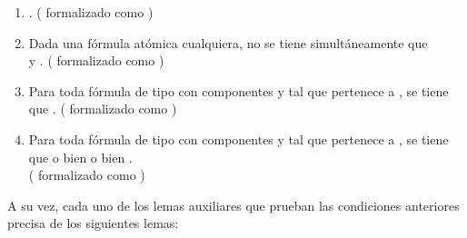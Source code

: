 \begin{isabellebody}
\begin{isamarkuptext}
    \begin{enumerate}
     \item {}. (\isa{{\isasymLongrightarrow}} formalizado como )
     \item Dada  una fórmula atómica cualquiera, no se tiene 
      simultáneamente que\\  y . (\isa{{\isasymLongrightarrow}} formalizado como )
     \item Para toda fórmula de tipo \isa{{\isasymalpha}} con componentes  y  tal que \isa{{\isasymalpha}}
      pertenece a , se tiene que . (\isa{{\isasymLongrightarrow}} formalizado como 
      )
     \item Para toda fórmula de tipo \isa{{\isasymbeta}} con componentes  y  tal que \isa{{\isasymbeta}}
      pertenece a , se tiene que o bien  o 
      bien .\\ (\isa{{\isasymLongrightarrow}} formalizado como )
    \end{enumerate}
  A su vez, cada uno de los lemas auxiliares que prueban las condiciones anteriores precisa de los
  siguientes lemas:


\end{isamarkuptext}
\end{isabellebody}
